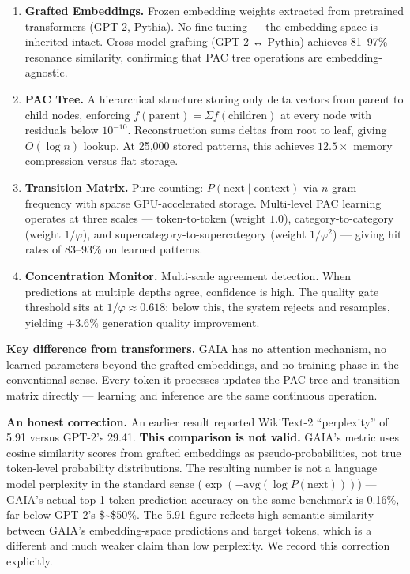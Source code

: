 \documentclass[
  11pt,
  a4paper]{article}
\begin{document}
\begin{enumerate}
\def\labelenumi{\arabic{enumi}.}
\item
  \textbf{Grafted Embeddings.} Frozen embedding weights extracted from
  pretrained transformers (GPT-2, Pythia). No fine-tuning --- the
  embedding space is inherited intact. Cross-model grafting (GPT-2 ↔
  Pythia) achieves 81--97\% resonance similarity, confirming that PAC
  tree operations are embedding-agnostic.
\item
  \textbf{PAC Tree.} A hierarchical structure storing only delta vectors
  from parent to child nodes, enforcing
  \(f(\text{parent}) = \Sigma f(\text{children})\) at every node with
  residuals below \(10^{-10}\). Reconstruction sums deltas from root to
  leaf, giving \(O(\log n)\) lookup. At 25,000 stored patterns, this
  achieves \(12.5\times\) memory compression versus flat storage.
\item
  \textbf{Transition Matrix.} Pure counting:
  \(P(\text{next} \mid \text{context})\) via \(n\)-gram frequency with
  sparse GPU-accelerated storage. Multi-level PAC learning operates at
  three scales --- token-to-token (weight \(1.0\)), category-to-category
  (weight \(1/\varphi\)), and supercategory-to-supercategory (weight
  \(1/\varphi^2\)) --- giving hit rates of 83--93\% on learned patterns.
\item
  \textbf{Concentration Monitor.} Multi-scale agreement detection. When
  predictions at multiple depths agree, confidence is high. The quality
  gate threshold sits at \(1/\varphi \approx 0.618\); below this, the
  system rejects and resamples, yielding \(+3.6\%\) generation quality
  improvement.
\end{enumerate}

\textbf{Key difference from transformers.} GAIA has no attention
mechanism, no learned parameters beyond the grafted embeddings, and no
training phase in the conventional sense. Every token it processes
updates the PAC tree and transition matrix directly --- learning and
inference are the same continuous operation.

\textbf{An honest correction.} An earlier result reported WikiText-2
``perplexity'' of 5.91 versus GPT-2's 29.41. \textbf{This comparison is
not valid.} GAIA's metric uses cosine similarity scores from grafted
embeddings as pseudo-probabilities, not true token-level probability
distributions. The resulting number is not a language model perplexity
in the standard sense (\(\exp(-\text{avg}(\log P(\text{next})))\)) ---
GAIA's actual top-1 token prediction accuracy on the same benchmark is
0.16\%, far below GPT-2's \$\sim\$50\%. The 5.91 figure reflects high
semantic similarity between GAIA's embedding-space predictions and
target tokens, which is a different and much weaker claim than low
perplexity. We record this correction explicitly.
\end{document}
